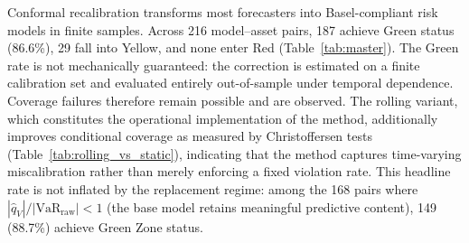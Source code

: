 \documentclass[preprint,11pt,authoryear]{elsarticle}
\newcommand{\1}{\boldsymbol{1}}
\begin{document}
	Conformal recalibration transforms most forecasters into
	Basel-compliant risk models in finite samples. Across 216 model--asset
	pairs, 187 achieve Green status (86.6\%), 29 fall into Yellow,
	and none enter Red (Table~\ref{tab:master}).
	The Green rate is not mechanically guaranteed: the correction is estimated on a finite calibration set and evaluated entirely out-of-sample under temporal dependence. Coverage failures therefore remain possible and are observed. The rolling variant, which constitutes the operational implementation of the method, additionally improves conditional coverage as measured by Christoffersen tests (Table~\ref{tab:rolling_vs_static}), indicating that the method captures time-varying miscalibration rather than merely enforcing a fixed violation rate.
	This headline rate
	is not inflated by the replacement regime: among the 168 pairs
	where $|\hat{q}_V|/|\mathrm{VaR}_{\mathrm{raw}}| < 1$ (the
	base model retains meaningful predictive content), 149 (88.7\%)
	achieve Green Zone status.
\end{document}
